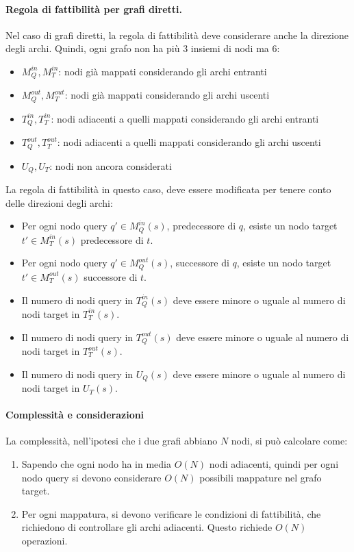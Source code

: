 \paragraph{Regola di fattibilità per grafi diretti.}
Nel caso di grafi diretti, la regola di fattibilità deve considerare anche la direzione degli archi. Quindi, ogni grafo non ha più 3 insiemi di nodi ma 6:
\begin{itemize}
    \item $M_Q^{in}, M_T^{in}$: nodi già mappati considerando gli archi entranti
    \item $M_Q^{out}, M_T^{out}$: nodi già mappati considerando gli archi uscenti
    \item $T_Q^{in}, T_T^{in}$: nodi adiacenti a quelli mappati considerando gli archi entranti
    \item $T_Q^{out}, T_T^{out}$: nodi adiacenti a quelli mappati considerando gli archi uscenti
    \item $U_Q, U_T$: nodi non ancora considerati
\end{itemize}

\noindent
La regola di fattibilità in questo caso, deve essere modificata per tenere conto delle direzioni degli archi:
\begin{itemize}
    \item Per ogni nodo query $q' \in M_Q^{in}(s)$, predecessore di $q$, esiste un nodo target $t' \in M_T^{in}(s)$ predecessore di $t$.
    \item Per ogni nodo query $q' \in M_Q^{out}(s)$, successore di $q$, esiste un nodo target $t' \in M_T^{out}(s)$ successore di $t$.
    \item Il numero di nodi query in $T_Q^{in}(s)$ deve essere minore o uguale al numero di nodi target in $T_T^{in}(s)$.
    \item Il numero di nodi query in $T_Q^{out}(s)$ deve essere minore o uguale al numero di nodi target in $T_T^{out}(s)$.
    \item Il numero di nodi query in $U_Q(s)$ deve essere minore o uguale al numero di nodi target in $U_T(s)$.
\end{itemize}

\paragraph{Complessità e considerazioni}
La complessità, nell'ipotesi che i due grafi abbiano $N$ nodi, si può calcolare come:
\begin{enumerate}
    \item Sapendo che ogni nodo ha in media $O(N)$ nodi adiacenti, quindi per ogni nodo query si devono considerare $O(N)$ possibili mappature nel grafo target.
    \item Per ogni mappatura, si devono verificare le condizioni di fattibilità, che richiedono di controllare gli archi adiacenti. Questo richiede $O(N)$ operazioni.
\end{enumerate}

